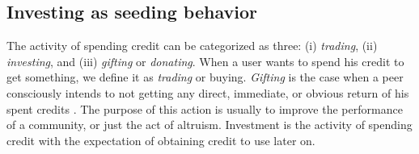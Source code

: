 \subsection{Investing as seeding behavior}
The activity of spending credit can be categorized as three: (i) \textit{trading}, (ii) \textit{investing}, and (iii) \textit{gifting} or \textit{donating}. When a user wants to spend his credit to get something, we define it as \textit{trading} or buying. \textit{Gifting} is the case when a peer consciously intends to not getting any direct, immediate, or obvious return of his spent credits \cite{2006:gifting:ripeanu}. The purpose of this action is usually to improve the performance of a community, or just the act of altruism. Investment is the activity of spending credit with the expectation of obtaining credit to use later on. 



